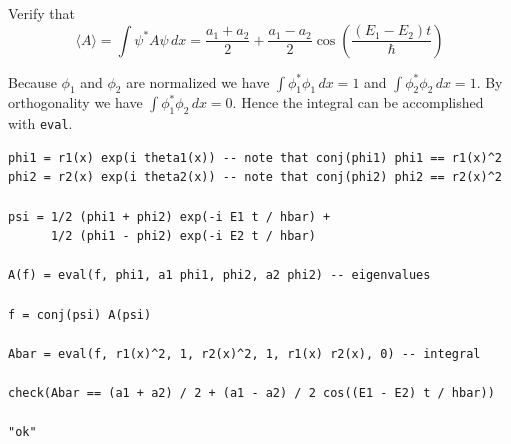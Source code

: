 \documentclass[12pt]{article}
\begin{document}
\begin{enumerate}
Verify that
\begin{equation*}
\langle A\rangle
=\int\psi^*A\psi\,dx
=\frac{a_1+a_2}{2}+\frac{a_1-a_2}{2}\cos\left(\frac{(E_1-E_2)t}{\hbar}\right)
\end{equation*}

Because $\phi_1$ and $\phi_2$ are normalized we have
$\int\phi_1^*\phi_1\,dx=1$ and $\int\phi_2^*\phi_2\,dx=1$.
By orthogonality we have $\int\phi_1^*\phi_2\,dx=0$.
Hence the integral can be accomplished with \verb$eval$.

{\color{blue}
\begin{verbatim}
phi1 = r1(x) exp(i theta1(x)) -- note that conj(phi1) phi1 == r1(x)^2
phi2 = r2(x) exp(i theta2(x)) -- note that conj(phi2) phi2 == r2(x)^2

psi = 1/2 (phi1 + phi2) exp(-i E1 t / hbar) +
      1/2 (phi1 - phi2) exp(-i E2 t / hbar)

A(f) = eval(f, phi1, a1 phi1, phi2, a2 phi2) -- eigenvalues

f = conj(psi) A(psi)

Abar = eval(f, r1(x)^2, 1, r2(x)^2, 1, r1(x) r2(x), 0) -- integral

check(Abar == (a1 + a2) / 2 + (a1 - a2) / 2 cos((E1 - E2) t / hbar))

"ok"
\end{verbatim}}

\end{enumerate}
\end{document}
